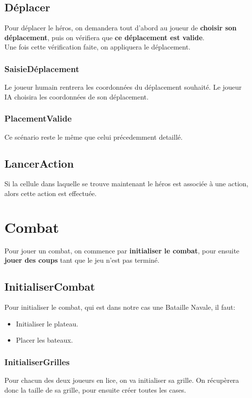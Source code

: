         \subsection{Déplacer}
            Pour déplacer le héros, on demandera tout d'abord au joueur de \textbf{choisir son déplacement}, puis on vérifiera que \textbf{ce déplacement est valide}.\\
            Une fois cette vérification faite, on appliquera le déplacement.
            \subsubsection{SaisieDéplacement}
                Le joueur humain rentrera les coordonnées du déplacement souhaité.
	    Le joueur IA choisira les coordonnées de son déplacement. 
            \subsubsection{PlacementValide}
                Ce scénario reste le même que celui précedemment detaillé.
        \subsection{LancerAction}
            Si la cellule dans laquelle se trouve maintenant le héros est associée à une action, alors cette action est effectuée.
    \section{Combat}
        Pour jouer un combat, on commence par \textbf{initialiser le combat}, pour ensuite \textbf{jouer des coups} tant que le jeu n'est pas terminé.
        \subsection{InitialiserCombat}
            Pour initialiser le combat, qui est dans notre cas une Bataille Navale, il faut:
            \begin{itemize}
                \item Initialiser le plateau.
                \item Placer les bateaux.
            \end{itemize}
            \subsubsection{InitialiserGrilles}
                Pour chacun des deux joueurs en lice, on va initialiser sa grille. On r\'ecupèrera donc la taille de sa grille, pour ensuite créer toutes les cases.
